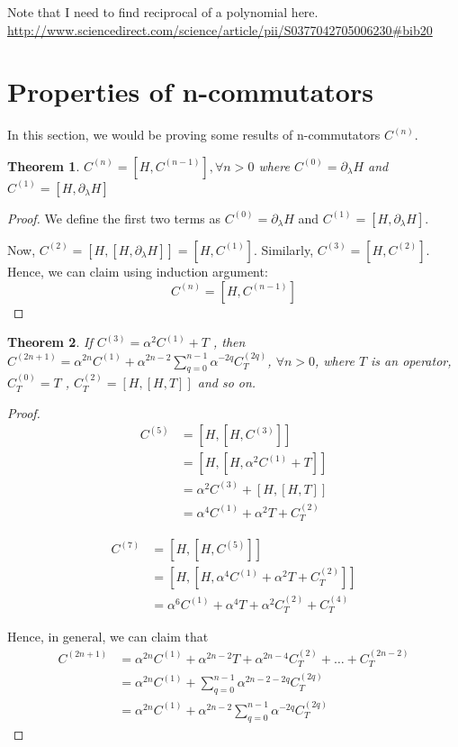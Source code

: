 \documentclass[11pt,a4paper]{article}
\newtheorem{thm}{Theorem}
\begin{document}
Note that I need to find reciprocal of a polynomial here.
\url{http://www.sciencedirect.com/science/article/pii/S0377042705006230#bib20}

\section{Properties of n-commutators}\label{sec.Cn}
In this section, we would be proving some results of n-commutators $C^{(n)}$.

 
\begin{thm}
$C^{(n)}= [H, C^{(n-1)}],  \forall n>0$ where $C^{(0)}=  \partial_{\lambda}H$ and  $C^{(1)}= [H, \partial_{\lambda}H]$
\end{thm}
\begin{proof}
We define the first two terms  as $C^{(0)}=  \partial_{\lambda}H$ and $C^{(1)}= [H, \partial_{\lambda}H]$. 


Now, $C^{(2)}= [H,[H, \partial_{\lambda}H]]= [H, C^{(1)}]$. Similarly, $C^{(3)}=  [H, C^{(2)}]$. Hence, we can claim using induction argument:
\begin{equation}
C^{(n)}= [H, C^{(n-1)}]
\end{equation}
\end{proof}
 


\begin{thm}
If $C^{(3)}=  \alpha^2  C^{(1)} + T$ , then $C^{(2n+1)}= \alpha^{2n} C^{(1)} +\alpha^{2n-2} \sum_{q=0}^{n-1} \alpha^{-2q}C^{(2q)}_T $, $\forall n>0$,  where $T$ is an operator,  $ C^{(0)}_T=T$ , $C^{(2)}_T=[H, [H, T]]$ and so on.
\end{thm}

\begin{proof}

\begin{align}
C^{(5)} &= [H,[H,C^{(3)}]]\\
&=[H,[H, \alpha^2  C^{(1)} + T ]] \\
&=\alpha^2 C^{(3)} + [H,[H, T ]] \\
&=\alpha^4 C^{(1)} + \alpha^2 T + C^{(2)}_T
\end{align}

\begin{align}
C^{(7)} &= [H,[H,C^{(5)}]]\\
&=[H,[H, \alpha^4 C^{(1)} + \alpha^2 T + C^{(2)}_T ]] \\
&=\alpha^6 C^{(1)} + \alpha^4 T + \alpha^2  C^{(2)}_T +   C^{(4)}_T
\end{align}

Hence, in general, we can claim that 
\begin{align*}
C^{(2n+1)} &=\alpha^{2n} C^{(1)} + \alpha^{2n-2} T +\alpha^{2n-4}  C^{(2)}_T + \ldots +    C^{(2n-2)}_T \\
&=\alpha^{2n} C^{(1)} + \sum_{q=0}^{n-1} \alpha^{2n-2-2q}C^{(2q)}_T \\
&=\alpha^{2n} C^{(1)} + \alpha^{2n-2} \sum_{q=0}^{n-1} \alpha^{-2q}C^{(2q)}_T 
\end{align*}
\end{proof}
\end{document}

